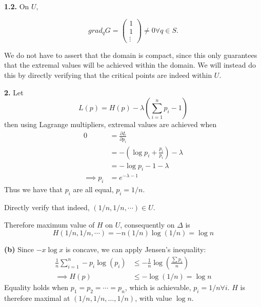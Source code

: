 \documentclass[a4paper, 12pt]{article}
\begin{document}
\begin{solution}
    \textbf{1.2.} On $U,$

    \[
        grad_{q}G = \begin{pmatrix}
            1 \\
            1 \\
            \vdots
        \end{pmatrix} \neq 0 \forall q \in S.
        \]

    We do not have to assert that the domain is compact, since this only guarantees that the extremal values will be achieved within the domain. We will instead do this by directly verifying that the critical points are indeed within $U$.

    \textbf{2.} Let \[
        L(p) = H(p) - \lambda \left(\sum_{i=1}^{n} p_i - 1\right)
    \]
    then using Lagrange multipliers, extremal values are achieved when
    \begin{align*}
        0            & = \frac{\partial L}{\partial p_i}          \\
                     & = - (\log p_i + \frac{p_i}{p_i}) - \lambda \\
                     & = - \log p_i - 1 - \lambda                 \\
        \implies p_i & = e^{-\lambda -1}
    \end{align*}
    Thus we have that $p_i$ are all equal, $p_i = 1/n$.

    Directly verify that indeed, $(1/n, 1/n, \cdots) \in U$.

    Therefore maximum value of $H$ on $U$, consequently on $\Delta$ is \[
        H(1/n, 1/n, \cdots) = -n (1/n) \log(1/n) = \log n
    \]



    \textbf{(b)} Since $-x \log x$ is concave, we can apply Jensen's inequality:
    \begin{align*}
        \frac{1}{n} \sum_{i=1}^{n} -p_i \log (p_i) & \leq -\frac{1}{n} \log\left(\frac{\sum p_i}{n}\right) \\
        \implies H(p)                              & \leq - \log(1/n) = \log n
    \end{align*}
    Equality holds when $p_1 = p_2 = \cdots = p_n$, which is achievable, $p_i = 1/n \forall i$. $H$ is therefore maximal at $(1/n, 1/n, \ldots, 1/n)$, with value $\log n$.
\end{solution}
\end{document}
